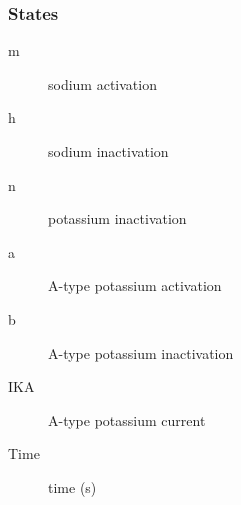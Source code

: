 \subsubsection{States}
\begin{description}
\item[m] sodium activation
\item[h] sodium inactivation
\item[n] potassium inactivation
\item[a] A-type potassium activation
\item[b] A-type potassium inactivation
\item[IKA] A-type potassium current
\item[Time] time (s)
\end{description}